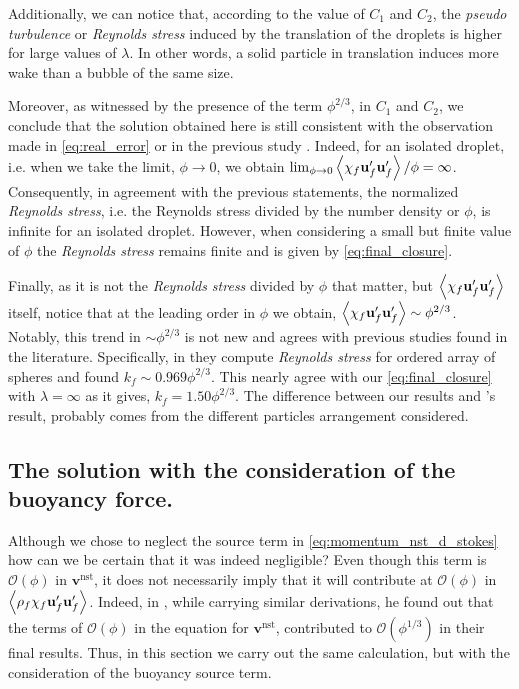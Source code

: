 Additionally, we can notice that, according to the value of $C_1$ and $C_2$, the \textit{pseudo turbulence} or \textit{Reynolds stress} induced by the translation of the droplets is higher for large values of $\lambda$. 
In other words, a solid particle in translation induces more wake than a bubble of the same size. 

Moreover, as witnessed by the presence of the term $\phi^{2/3}$, in $C_1$ and $C_2$, we conclude that the solution obtained here is still consistent with the observation made in \ref{eq:real_error} or in the previous study \citep{caflisch1985variance}. 
Indeed, for an isolated droplet, i.e. when we take the limit, $\phi \to 0$, we obtain $\lim_{\phi \to 0} \left<\chi_f \textbf{u}_f' \textbf{u}_f'\right> / \phi = \infty$. 
Consequently, in agreement with the previous statements, the normalized \textit{Reynolds stress}, i.e. the Reynolds stress divided by the number density or $\phi$,  is infinite for an isolated droplet.
However, when considering a small but finite value of $\phi$ the \textit{Reynolds stress} remains finite and is given by \ref{eq:final_closure}. 

Finally, as it is not the \textit{Reynolds stress} divided by $\phi$ that matter, but $\left<\chi_f\textbf{u}_f'\textbf{u}_f'\right>$ itself, notice that at the leading order in $\phi$ we obtain,  $\left<\chi_f\textbf{u}_f'\textbf{u}_f'\right>\sim\phi^{2/3}$. 
Notably, this trend in $\sim\phi^{2/3}$ is not new and agrees with previous studies found in the literature.
Specifically, in \citet{hill2001first} they compute \textit{Reynolds stress} for ordered array of spheres and found $k_f \sim 0.969 \phi^{2/3}$. 
This nearly agree with our \ref{eq:final_closure} with $\lambda =\infty$ as it gives, $k_f  = 1.50 \phi^{2/3}$.
The difference between our results and \citet{hill2001first}'s result, probably comes from the different particles arrangement considered.  



\subsection{The solution with the consideration of the buoyancy force. }

Although we chose to neglect the source term in \ref{eq:momentum_nst_d_stokes} how can we be certain that it was indeed negligible? 
Even though this term is $\mathcal{O}(\phi)$ in $\textbf{v}^\text{nst}$, it does not necessarily imply that it will contribute at $\mathcal{O}(\phi)$ in $\left<\rho_f\chi_f \textbf{u}_f'\textbf{u}_f'\right>$. 
Indeed, in \citet{zhang2021ensemble}, while carrying similar derivations, he found out that the terms of $\mathcal{O}(\phi)$ in the equation for $\textbf{v}^\text{nst}$, contributed to $\mathcal{O}(\phi^{1/3})$ in their final results.  
Thus, in this section we carry out the same calculation, but with the consideration of the buoyancy source term. 

